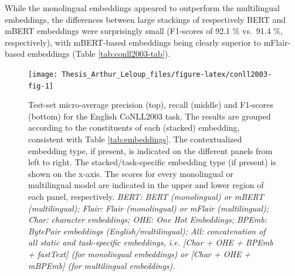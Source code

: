 \documentclass[12pt,a4paper,]{book}
\begin{document}
While the monolingual embeddings appeared to outperform the multilingual embeddings, the differences between large stackings of respectively BERT and mBERT embeddings were surprisingly small (F1-scores of 92.1 \% vs.~91.4 \%, respectively), with mBERT-based embeddings being clearly superior to mFlair-based embeddings (Table \ref{tab:conll2003-tab}).

\begin{figure}

{\centering \texttt{[image: Thesis\_Arthur\_Leloup\_files/figure-latex/conll2003-fig-1]} 

}

\caption{Test-set micro-average precision (top), recall (middle) and F1-scores (bottom) for the English CoNLL2003 task. The results are grouped according to the constituents of each (stacked) embedding, consistent with Table \ref{tab:embeddings}. The contextualized embedding type, if present, is indicated on the different panels from left to right. The stacked/task-specific embedding type (if present) is shown on the x-axis. The scores for every monolingual or multilingual model are indicated in the upper and lower region of each panel, respectively. \emph{BERT: BERT (monolingual) or mBERT (multilingual); Flair: Flair (monolingual) or mFlair (multilingual); Char: character embeddings; OHE: One Hot Embeddings; BPEmb: BytePair embeddings (English/multilingual); All: concatenation of all static and task-specific embeddings, i.e. {[}Char + OHE + BPEmb + fastText{]} (for monolingual embeddings) or {[}Char + OHE + mBPEmb{]} (for multilingual embeddings).}}\label{fig:conll2003-fig}
\end{figure}
\end{document}
